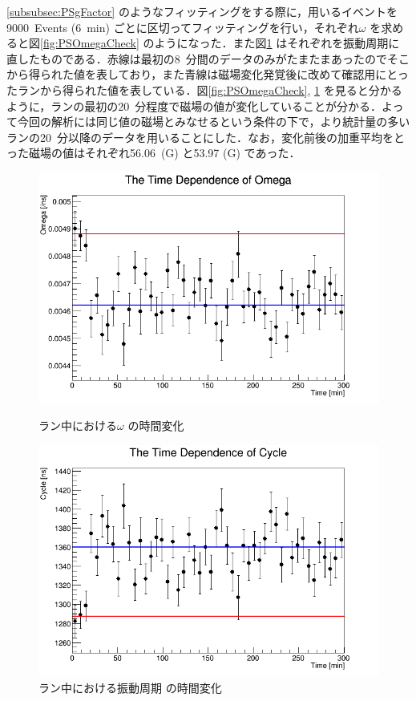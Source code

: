 \ref{subsubsec:PSgFactor} のようなフィッティングをする際に，用いるイベントを9000~Events (6~min) ごとに区切ってフィッティングを行い，それぞれ$\omega$ を求めると図\ref{fig:PSOmegaCheck} のようになった．また図\ref{fig:PSCycleCheck} はそれぞれを振動周期に直したものである．赤線は最初の8~分間のデータのみがたまたまあったのでそこから得られた値を表しており，また青線は磁場変化発覚後に改めて確認用にとったランから得られた値を表している．図\ref{fig:PSOmegaCheck}, \ref{fig:PSCycleCheck} を見ると分かるように，ランの最初の20~分程度で磁場の値が変化していることが分かる．よって今回の解析には同じ値の磁場とみなせるという条件の下で，より統計量の多いランの20~分以降のデータを用いることにした．なお，変化前後の加重平均をとった磁場の値はそれぞれ56.06~(G) と53.97 (G) であった．

\begin{figure}[h]
	\centering
	\begin{minipage}{0.45\textwidth}
	\centering
	\includegraphics[width = \textwidth]{figure/odagawa/PSOmegaCheck.png}
	\caption{ラン中における$\omega$ の時間変化}
	\label{fig:PSOmegaCheck}
	\end{minipage}
	\begin{minipage}{0.45\textwidth}
	\centering
	\includegraphics[width = \textwidth]{figure/odagawa/PSCycleCheck.png}
	\caption{ラン中における振動周期 の時間変化}
	\label{fig:PSCycleCheck}
	\end{minipage}
\end{figure}

